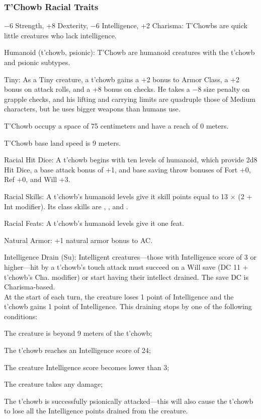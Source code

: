\subsubsection{T'Chowb Racial Traits}
\begin{itemize*}
	\item $-6$ Strength, +8 Dexterity, $-6$ Intelligence, +2 Charisma: T'Chowbs are quick little creatures who lack intelligence.
    \item Humanoid (t'chowb, psionic): T'Chowb are humanoid creatures with the t'chowb and psionic subtypes.
	\item Tiny: As a Tiny creature, a t'chowb gains a +2 bonus to Armor Class, a +2 bonus on attack rolls, and a +8 bonus on  checks. He takes a $-8$ size penalty on grapple checks, and his lifting and carrying limits are quadruple those of Medium characters, but he uses bigger weapons than humans use.
    \item T'Chowb occupy a space of 75 centimeters and have a reach of 0 meters.
    \item T'Chowb base land speed is 9 meters.

    \item Racial Hit Dice: A t'chowb begins with ten levels of humanoid, which provide 2d8 Hit Dice, a base attack bonus of +1, and base saving throw bonuses of Fort +0, Ref +0, and Will +3.
    \item Racial Skills: A t'chowb's humanoid levels give it skill points equal to 13 $\times$ (2 + Int modifier). Its class skills are , ,  and .
    \item Racial Feats: A t'chowb's humanoid levels give it one feat.

    \item Natural Armor: +1 natural armor bonus to AC.

    \item Intelligence Drain (Su): Intelligent creatures---those with Intelligence score of 3 or higher---hit by a t'chowb's touch attack must succeed on a Will save (DC 11 + t'chowb's Cha. modifier) or start having their intellect drained. The save DC is Charisma-based.\\

    At the start of each turn, the creature loses 1 point of Intelligence and the t'chowb gains 1 point of Intelligence. This draining stops by one of the following conditions:
    \begin{itemize*}
        \item The creature is beyond 9 meters of the t'chowb;
        \item The t'chowb reaches an Intelligence score of 24;
        \item The creature Intelligence score becomes lower than 3;
        \item The creature takes any damage;
        \item The t'chowb is successfully psionically attacked---this will also cause the t'chowb to lose all the Intelligence points drained from the creature.
    \end{itemize*}


\end{itemize*}
